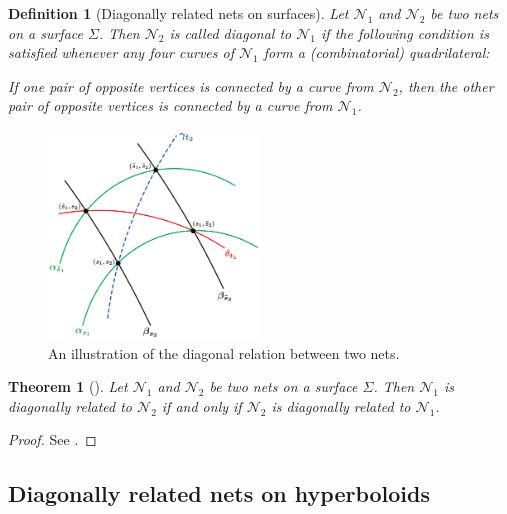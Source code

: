 \documentclass[10pt, a4paper]{article}
\theoremstyle{BoldTopSpacing}
\newtheorem{theorem}{Theorem}[section]
\theoremstyle{BoldTopSpacing}
\theoremstyle{BoldTopSpacing}
\theoremstyle{BoldTopBottomSpacing}
\newtheorem{definition}{Definition}[section]
\theoremstyle{BoldTopSpacing}
\theoremstyle{BoldTopBottomSpacing}
\theoremstyle{remark}
\begin{document}
\begin{definition}[Diagonally related nets on surfaces]
\label{def:diag-nets-on-surfaces}
Let $\mathcal{N}_{1}$ and $\mathcal{N}_{2}$ be two nets on a surface $\Sigma$. Then $\mathcal{N}_{2}$ is called diagonal
to $\mathcal{N}_{1}$ if the following condition is satisfied whenever any four curves of $\mathcal{N}_{1}$ form a
(combinatorial) quadrilateral: \newline
\begin{mathbox}{}
If one pair of opposite vertices is connected by a curve from $\mathcal{N}_{2}$, then the other pair of opposite vertices is connected by a curve from $\mathcal{N}_{1}$.
\end{mathbox}
\end{definition}

\begin{figure}[H]
    \centering
    \includegraphics[width=0.5\textwidth]{diagonally_related_diagram.png}
    \caption{An illustration of the diagonal relation between two nets.}
    \label{fig:diagonally-related-diagram}
\end{figure}

\begin{theorem}[]
\label{thm:symmetric-definition-diagonal-nets}
Let $\mathcal{N}_1$ and $\mathcal{N}_2$ be two nets on a surface $\Sigma$. Then $\mathcal{N}_1$ is diagonally related to
$\mathcal{N}_2$ if and only if $\mathcal{N}_2$ is diagonally related to $\mathcal{N}_1$.
\end{theorem}

\begin{proof}
    See \cite[\textcolor{CitationColor}{Theorem~8.2.}]{geometryIII}.
\end{proof}
\subsection{Diagonally related nets on hyperboloids}
\end{document}
